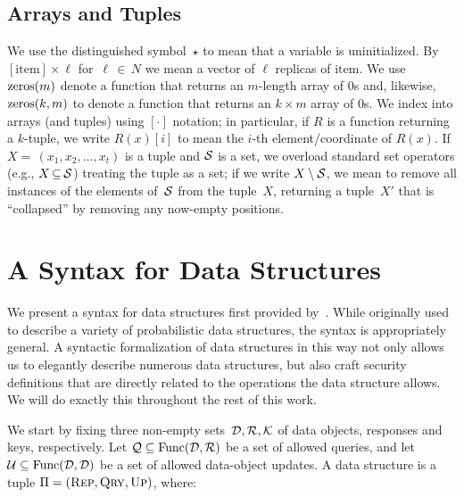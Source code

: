 \subsection{Arrays and Tuples}

We use the distinguished symbol~$\star$ to mean that a variable is uninitialized. By $[\text{item}] \times \ell$ for~$\ell \,{\in}\, N$ we mean a vector of $\ell$ replicas of $\text{item}$. We use $\mathrm{zeros}(m)$ denote a function that returns an $m$-length array of 0s and, likewise, $\mathrm{zeros}(k,m)$ to denote a function that returns an $k \times m$ array of 0s.  We index into arrays (and tuples) using $[\cdot]$ notation; in particular, if $R$ is a function returning a $k$-tuple, we write $R(x)[i]$ to mean the $i$-th element/coordinate of $R(x)$.  If~$X{=}\,(x_1,x_2,\ldots,x_t)$ is a tuple and $\mathcal{S}$ is a set, we overload standard set operators (e.g., $X \,{\subseteq}\, \mathcal{S}$) treating the tuple as a set; if we write $X \setminus \mathcal{S}$, we mean to remove all instances of the elements of~$\mathcal{S}$ from the tuple~$X$, returning a tuple~$X'$ that is ``collapsed'' by removing any now-empty positions.

\section{A Syntax for Data Structures}\label{subsec:syntax}

We present a syntax for data structures first provided by~\cite{clayton2019}. While originally used to describe a variety of probabilistic data structures, the syntax is appropriately general. A syntactic formalization of data structures in this way not only allows us to elegantly describe numerous data structures, but also craft security definitions that are directly related to the operations the data structure allows. We will do exactly this throughout the rest of this work.

We start by fixing three non-empty sets~$\mathcal{D},\mathcal{R},\mathcal{K}$ of data objects, responses and keys, respectively.  Let $\mathcal{Q}\subseteq \mathrm{Func}(\mathcal{D},\mathcal{R})$ be a set of allowed queries, and let $\mathcal{U} \subseteq \mathrm{Func}(\mathcal{D},\mathcal{D})$ be a set of allowed data-object updates.  A data structure is a tuple $\Pi =
(\textnormal{\textsc{Rep}},\textnormal{\textsc{Qry}},\textnormal{\textsc{Up}})$, where:

